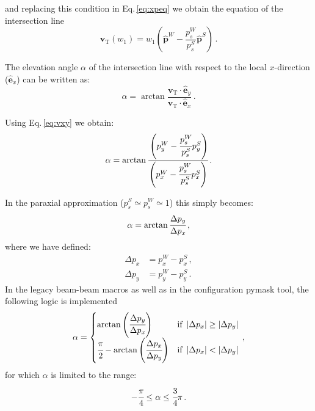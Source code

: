 and replacing this condition in Eq.\,\eqref{eq:xpeq} we obtain the equation of the intersection line
\begin{equation}
    \textbf{v}_\text{T}(w_1) = w_1 \left(\hat{\textbf{p}}^W -
    \frac{p^W_{s}}{p^S_{s}} \hat{\textbf{p}}^S\right)
    \, .
\label{eq:vxy}
\end{equation}



The elevation angle $\alpha$ of the intersection line with respect to the local $x$-direction ($\hat{\textbf{e}}_x$) can be written as:
\begin{equation}
    \alpha=\arctan \frac
    {\textbf{v}_\text{T}\cdot\hat{\textbf{e}}_y}
    {\textbf{v}_\text{T}\cdot\hat{\textbf{e}}_x}
    \, .
\end{equation}

Using Eq.\,\eqref{eq:vxy} we obtain:
\begin{equation}
    \alpha=\arctan \cfrac
    {\left(p_y^W -
    \cfrac{p^W_{s}}{p^S_{s}} p_y^S\right)}
    {\left(p_x^W -
    \cfrac{p^W_{s}}{p^S_{s}} p_x^S\right)}
    \,. 
\end{equation}

In the paraxial approximation ($p^S_{s} \simeq p^W_{s}\simeq 1$) this simply becomes:
\begin{equation}
    \alpha=\arctan \cfrac
    {\Delta p_y}
    {\Delta p_x}
    \, ,
    \label{eq:alpha1}
\end{equation}
where we have defined:
\begin{align}
    \Delta p_x &= p_x^W - p_x^S \, ,\\
    \Delta p_y &= p_y^W - p_y^S \, .
\end{align}
In the legacy beam-beam macros as well as in the configuration pymask tool, the following logic is implemented
\begin{equation}
    \alpha = \begin{cases} 
    \arctan \left(\cfrac
    {\Delta p_y}
    {\Delta p_x}\right) &\mbox{if } \left|\Delta p_x\right| \geq \left|\Delta p_y\right| \\ 
    \cfrac{\pi}{2} - \arctan \left(\cfrac
    {\Delta p_x}
    {\Delta p_y}
    \right)&\mbox{if } \left|\Delta p_x\right| < \left|\Delta p_y\right| \end{cases}
    \, ,
\end{equation}
for which $\alpha$ is limited to the range:
\begin{equation}
     -\cfrac{\pi}{4}  \leq \alpha \leq \cfrac{3}{4}\pi
     \, .
\end{equation}

